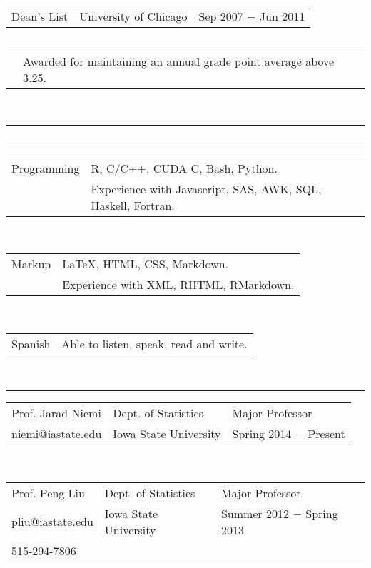 \documentclass{article}
\newcommand{\q}{$\quad$ \newline}
\newcommand{\vl}{4.25}
\newcommand{\wl}{8.4}
\newcommand{\ww}{13}
\newcommand{\myrule}{\noindent \rule{\textwidth}{1pt}}
\begin{document}
\noindent \begin{tabular}{@{}p{\vl cm}p{\wl cm}l@{}}
Dean's List & University of Chicago & Sep 2007 $-$ Jun 2011 \\
\end{tabular} \q

\noindent \begin{tabular}{@{}p{\vl cm}p{\ww cm}@{}}
& Awarded for maintaining an annual grade point average above 3.25. 
\end{tabular} \q \q 



\myrule
\nocite{*}

\noindent  \q



\myrule
 
\noindent \begin{tabular}{@{}p{\vl cm}p{\ww cm}@{}}
Programming & R, C/C++, CUDA C, Bash, Python.   \\
 & Experience with Javascript, SAS, AWK, SQL, Haskell, Fortran.  \\
\end{tabular} \q \q

\noindent \begin{tabular}{@{}p{\vl cm}p{\ww cm}@{}}
Markup& LaTeX, HTML, CSS, Markdown.   \\
 & Experience with XML, RHTML, RMarkdown.  \\
\end{tabular} \q \q

\noindent \begin{tabular}{@{}p{\vl cm}p{\ww cm}@{}}
Spanish & Able to listen, speak, read and write.   \\
\end{tabular} \q \q \q


\myrule

\noindent \begin{tabular}{@{}p{\vl cm}p{\wl cm}l@{}}
Prof. Jarad Niemi & Dept. of Statistics & Major Professor  \\
niemi@iastate.edu & Iowa State University & Spring 2014 $-$ Present \\
\end{tabular} \q \q

\noindent \begin{tabular}{@{}p{\vl cm}p{\wl cm}l@{}}
Prof. Peng Liu & Dept. of Statistics & Major Professor \\
pliu@iastate.edu & Iowa State University & Summer 2012 $-$ Spring 2013 \\
515-294-7806 & & 
\end{tabular} \q \q
\end{document}
